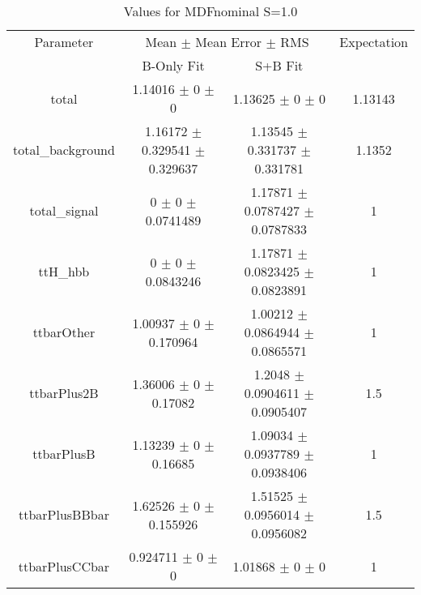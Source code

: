 \begin{table}
\centering
\caption{Values for MDFnominal S=1.0}
\begin{tabular}{cccc}
\toprule
Parameter & \multicolumn{2}{c}{Mean $\pm$ Mean Error $\pm$ RMS} & Expectation\\
 & B-Only Fit & S+B Fit & \\
\midrule
total & \num{1.14016} $\pm$ \num{0} $\pm$ \num{0} & \num{1.13625} $\pm$ \num{0} $\pm$ \num{0} & \num{1.13143}\\
total\_background & \num{1.16172} $\pm$ \num{0.329541} $\pm$ \num{0.329637} & \num{1.13545} $\pm$ \num{0.331737} $\pm$ \num{0.331781} & \num{1.1352}\\
total\_signal & \num{0} $\pm$ \num{0} $\pm$ \num{0.0741489} & \num{1.17871} $\pm$ \num{0.0787427} $\pm$ \num{0.0787833} & \num{1}\\
ttH\_hbb & \num{0} $\pm$ \num{0} $\pm$ \num{0.0843246} & \num{1.17871} $\pm$ \num{0.0823425} $\pm$ \num{0.0823891} & \num{1}\\
ttbarOther & \num{1.00937} $\pm$ \num{0} $\pm$ \num{0.170964} & \num{1.00212} $\pm$ \num{0.0864944} $\pm$ \num{0.0865571} & \num{1}\\
ttbarPlus2B & \num{1.36006} $\pm$ \num{0} $\pm$ \num{0.17082} & \num{1.2048} $\pm$ \num{0.0904611} $\pm$ \num{0.0905407} & \num{1.5}\\
ttbarPlusB & \num{1.13239} $\pm$ \num{0} $\pm$ \num{0.16685} & \num{1.09034} $\pm$ \num{0.0937789} $\pm$ \num{0.0938406} & \num{1}\\
ttbarPlusBBbar & \num{1.62526} $\pm$ \num{0} $\pm$ \num{0.155926} & \num{1.51525} $\pm$ \num{0.0956014} $\pm$ \num{0.0956082} & \num{1.5}\\
ttbarPlusCCbar & \num{0.924711} $\pm$ \num{0} $\pm$ \num{0} & \num{1.01868} $\pm$ \num{0} $\pm$ \num{0} & \num{1}\\
\bottomrule
\end{tabular}
\end{table}